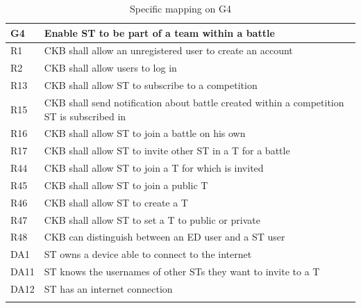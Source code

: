   \begin{longtable}{|l|p{12cm}|}
    \hline
    \textbf{G4} & \textbf{Enable ST to be part of a team within a battle}      \\
    \hline
    R1 & CKB shall allow an unregistered user to create an account \\
    \hline
    R2 & CKB shall allow users to log in \\
    \hline
    R13 & CKB shall allow ST to subscribe to a competition \\
    \hline
    R15 & CKB shall send notification about battle created within a competition ST is subscribed in \\
    \hline
    R16 & CKB shall allow ST to join a battle on his own \\
    \hline
    R17 & CKB shall allow ST to invite other ST in a T for a battle \\
    \hline
    R44 & CKB shall allow ST to join a T for which is invited \\
    \hline
    R45 & CKB shall allow ST to join a public T \\
    \hline
    R46 & CKB shall allow ST to create a T \\
    \hline
    R47 & CKB shall allow ST to set a T to public or private \\
    \hline
    R48 & CKB can distinguish between an ED user and a ST user \\
    \hline
    DA1 & ST owns a device able to connect to the internet \\
    \hline
    DA11 & ST knows the usernames of other STs they want to invite to a T \\
    \hline
    DA12 & ST has an internet connection \\
    \hline

    \caption{Specific mapping on G4}
    \label{tab:mappingG4}
  \end{longtable}

